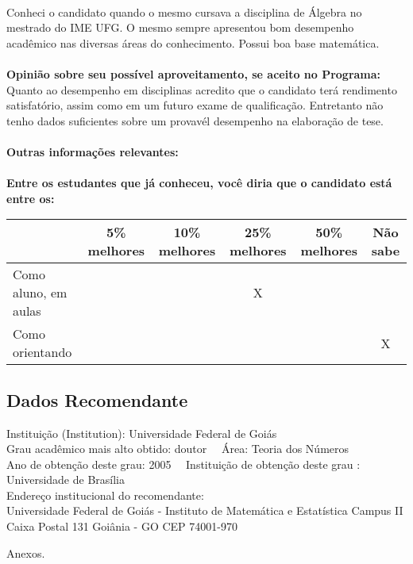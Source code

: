 \documentclass[11pt]{article}
\begin{document}
\\Conheci o candidato quando o mesmo cursava a disciplina de Álgebra no mestrado do IME UFG. O mesmo sempre apresentou bom desempenho acadêmico nas diversas áreas do conhecimento. Possui boa base matemática.\\
\\
\textbf{Opinião sobre seu possível aproveitamento, se aceito no Programa:}
\\Quanto ao desempenho em disciplinas acredito que o candidato terá rendimento satisfatório, assim como em um futuro exame de qualificação. Entretanto não tenho dados suficientes sobre um provavél desempenho na elaboração de tese.\\ 
\\
\textbf{Outras informações relevantes:} \\
\\[0.3cm]
\textbf{Entre os estudantes que já conheceu, você diria que o candidato está entre os:}
\\
\begin{tabular}{|l|c|c|c|c|c|}
\hline
 & 5\% melhores & 10\% melhores & 25\% melhores & 50\% melhores & Não sabe \\
\hline
Como aluno, em aulas &  &  & X &  & \\
\hline
Como orientando &  &  &  &  & X\\
\hline
\end{tabular}
\subsection*{Dados Recomendante} 
	Instituição (Institution): Universidade Federal de Goiás
\\ 
	Grau acadêmico mais alto obtido: doutor
	\ \ Área: Teoria dos Números
	\\
	Ano de obtenção deste grau: 2005
	\ \ 
	Instituição de obtenção deste grau : Universidade de Brasília
	\\ 
	Endereço institucional do recomendante: \\ Universidade Federal de Goiás - Instituto de Matemática e Estatística
Campus II Caixa Postal 131 Goiânia - GO
CEP 74001-970 
\begin{center}
Anexos.
\end{center}
\end{document}
